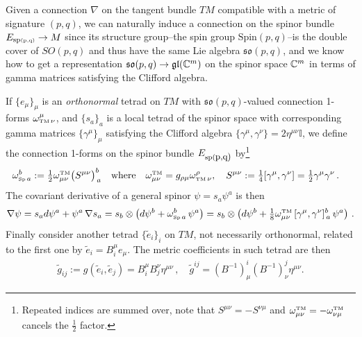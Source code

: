 \documentclass[../geometry_main.tex]{subfiles}
\begin{document}
\begin{mytheorem}
%
Given a connection $\nabla$ on the tangent bundle $TM$ compatible with a metric of signature $(p,q)$,  we can naturally induce a connection on the spinor bundle $E_{\text{sp\tiny(p,q)}}\to M$ since its structure group--the spin group $\text{Spin}(p,q)$--is the double cover of $SO(p,q)$ and thus have the same Lie algebra $\mathfrak{so}(p,q)$, and we know how to get a representation $\mathfrak{so}(p,q) \to \mathfrak{gl}(\mathbb{C}^m)$ on the spinor space $\mathbb{C}^m$ in terms of gamma matrices satisfying the Clifford algebra.
\smallskip

If $\{e_{\mu}\}_\mu$ is an \emph{orthonormal} tetrad on $TM$ with $\mathfrak{so}(p,q)$-valued connection 1-forms $\omega^{\mu}_{{\text{\tiny TM}}\,\nu}$, and $\{s_a\}_a$ is a local tetrad of the spinor space with corresponding gamma matrices $\{\gamma^\mu\}_\mu$ satisfying the Clifford algebra $\{\gamma^\mu, \gamma^\nu\} = 2 \eta^{\mu\nu} \mathbb{I}$, we define the connection 1-forms on the spinor bundle $E_{\text{sp(\small p,q)}}$ by\footnote{Repeated indices are summed over, note that $S^{\mu\nu}=-S^{\nu\mu}$ and $\omega^{\text{\tiny TM}}_{\mu\nu}=-\omega^{\text{\tiny TM}}_{\nu\mu}$ cancels the $\tfrac12$ factor.}
\begin{align}
    \omega^{b}_{{\text{\tiny Sp}}\, a}&:= \tfrac12 \omega^{\text{\tiny TM}}_{\mu\nu} \big(S^{\mu\nu}\big)^b_{\,a} \quad \text{where}\quad \omega^{\text{\tiny TM}}_{\mu\nu}= g_{\rho\mu} \omega^\rho_{{\text{\tiny TM}}\, \nu}, \quad S^{\mu\nu} := \tfrac{1}{4} [\gamma^\mu, \gamma^\nu] = \tfrac12 \gamma^\mu\gamma^\nu\,.
\end{align}
The covariant derivative of a general spinor $\psi = s_a \psi^a$ is then
\begin{equation}
    \nabla \psi =  s_a d\psi^a + \psi^a \, \nabla s_a = s_b\otimes \left( d \psi^b + \omega^b_{\text{\tiny Sp}\, a} \, \psi^a \right)=
     s_b\otimes \left( d \psi^b + \tfrac{1}{8} \omega^{\text{\tiny TM}}_{\mu\nu}\, [\gamma^\mu, \gamma^\nu]^b_{\,a} \, \psi^a \right)\,.
\end{equation}
%
Finally consider another tetrad $\{\tilde{e}_i\}_i$ on $TM$, not necessarily orthonormal, related to the first one by $\tilde{e}_i= B_i^\mu e_\mu$.
The metric coefficients in such tetrad are then
\begin{align}
    \tilde{g}_{ij}:=g(\tilde{e}_i,\tilde{e}_j) = B_i^\mu B_j^\nu \eta^{\mu\nu}\,,\quad \tilde{g}^{ij} = (B^{-1})^i_\mu (B^{-1})^j_\nu \eta^{\mu\nu}.
\end{align}

\end{mytheorem}
\end{document}
